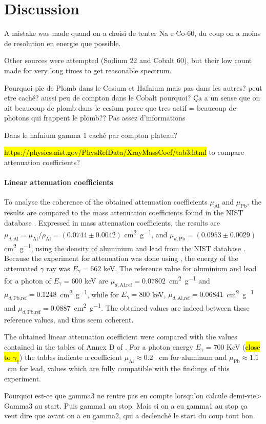 \section{Discussion}
A mistake was made quand on a choisi de tenter Na e Co-60, du coup on a moins de resolution en energie que possible.

Other sources were attempted (Sodium 22 and Cobalt 60), 
but their low count made for very long times to get reasonable spectrum.

Pourquoi pic de Plomb dans le Cesium et Hafnium mais pas dans les autres?
peut etre caché? aussi peu de compton dans le Cobalt pourquoi?
Ça a un sense que on ait beaucoup de plomb dans le cesium parce que tres actif = beaucoup de photons qui frappent le plomb??
Pas assez d'informations

Dans le hafnium gamma 1 caché par compton plateau?


\hl{https://physics.nist.gov/PhysRefData/XrayMassCoef/tab3.html} to compare attenuation coefficients?

\paragraph{Linear attenuation coefficients}
To analyse the coherence of the obtained attenuation coefficients \(\mu_\textrm{Al}\) and \(\mu_\textrm{Pb}\), the results are compared to the mass attenuation coefficients found in the NIST database \cite{massic-linear-attenuation}. Expressed in mass attenuation coefficients, the results are \(\mu_{d,\textrm{Al}} = \mu_{\textrm{Al}} / \rho_\textrm{Al} = \left(0.0744 \pm 0.0042\right)\) \si{\centi\meter\squared\per\gram}, and \(\mu_{d,\textrm{Pb}} = \left(0.0953 \pm 0.0029\right)\) \si{\centi\meter\squared\per\gram}, using the density of aluminium and lead from the NIST database \cite{material-density}. Because the experiment for attenuation was done using \cesium, the energy of the attenuated \(\gamma\) ray was \(E_\gamma = 662\) keV. The reference value for aluminium and lead for a photon of \(E_\gamma = 600\) keV are \mbox{\(\mu_{d,\textrm{Al,ref}} = 0.07802\) \si{\centi\meter\squared\per\gram}} and \mbox{\(\mu_{d,\textrm{Pb,ref}} = 0.1248\) \si{\centi\meter\squared\per\gram}}, while for \(E_\gamma = 800\) keV, \mbox{\(\mu_{d,\textrm{Al,ref}} = 0.06841\) \si{\centi\meter\squared\per\gram}} and \mbox{\(\mu_{d,\textrm{Pb,ref}} = 0.0887\) \si{\centi\meter\squared\per\gram}}. The obtained values are indeed between these reference values, and thus seem coherent.

The obtained linear attenuation coefficient were compared 
with the values contained in the tables of Annex D of \cite{notice_generale}.
For a photon energy $E_{\gamma} = 700$ KeV (\hl{close to $\gamma_1$}) the tables indicate a coefficient 
$\mu_{\mathrm{Al}} \approx 0.2$ \unit{\per\cm} for aluminum and 
$\mu_{\mathrm{Pb}} \approx 1.1$ \unit{\per\cm} for lead,
values which are fully compatible with the findings of this experiment.

Pourquoi est-ce que gamma3 ne rentre pas en compte lorsqu'on calcule demi-vie>
Gamma3 au start. Puis gamma1 au stop. Mais si on a eu gamma1 au stop ça veut dire que avant on a eu gamma2, qui a declenché le start du coup tout bon.
